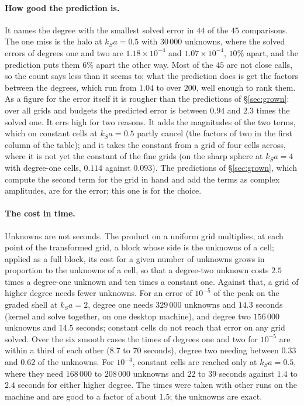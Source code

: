 \documentclass[11pt,a4paper]{article}
\begin{document}
\paragraph{How good the prediction is.} It names the degree with the smallest solved error in $44$ of the
$45$ comparisons. The one miss is the halo at $k_Sa=0.5$ with $30\,000$ unknowns, where the solved errors
of degrees one and two are $1.18\times10^{-4}$ and $1.07\times10^{-4}$, $10\%$ apart, and the prediction
puts them $6\%$ apart the other way. Most of the $45$ are not close calls, so the count says less than
it seems to; what the prediction does is get the factors between the degrees, which run from $1.04$ to
over $200$, well enough to rank them. As a figure for the error itself it is rougher than the
predictions of \S\ref{sec:grown}: over all grids and budgets the predicted error is between $0.94$ and
$2.3$ times the solved one. It errs high for two reasons. It adds the magnitudes of the two terms,
which on constant cells at $k_Sa=0.5$ partly cancel (the factors of two in the first column of the
table); and it takes the constant from a grid of four cells across, where it is not yet the constant of
the fine grids (on the sharp sphere at $k_Sa=4$ with degree-one cells, $0.114$ against $0.093$). The predictions of \S\ref{sec:grown}, which compute the second
term for the grid in hand and add the terms as complex amplitudes, are for the error; this one is for
the choice.

\paragraph{The cost in time.} Unknowns are not seconds. The product on a uniform grid multiplies, at
each point of the transformed grid, a block whose side is the unknowns of a cell; applied as a full
block, its cost for a given number of unknowns grows in proportion to the unknowns of a cell, so that a
degree-two unknown costs $2.5$ times a degree-one unknown and ten times a constant one. Against that, a
grid of higher degree needs fewer unknowns. For an
error of $10^{-5}$ of the peak on the graded shell at $k_Sa=2$, degree one needs $329\,000$ unknowns and
$14.3$ seconds (kernel and solve together, on one desktop machine), and degree two $156\,000$ unknowns
and $14.5$ seconds; constant cells do not reach that error on any grid solved. Over the six smooth
cases the times of degrees one and two for $10^{-5}$ are within a third of each other ($8.7$ to $70$
seconds), degree two needing between $0.33$ and $0.62$ of the unknowns. For $10^{-4}$, constant cells
are reached only at $k_Sa=0.5$, where they need $168\,000$ to $208\,000$ unknowns and $22$ to $39$
seconds against $1.4$ to $2.4$ seconds for either higher degree. The times were taken with other runs
on the machine and are good to a factor of about $1.5$; the unknowns are exact.
\end{document}

